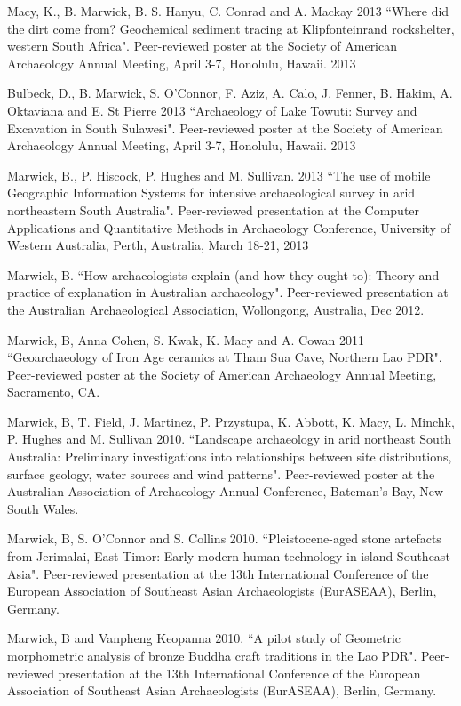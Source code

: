 \documentclass[11pt,article,oneside]{memoir}
\begin{document}
\ind Macy, K., B. Marwick, B. S. Hanyu, C. Conrad and A. Mackay 2013 ``Where did the dirt come from? Geochemical sediment tracing at Klipfonteinrand rockshelter, western South Africa". Peer-reviewed poster at the Society of American Archaeology Annual Meeting, April 3-7, Honolulu, Hawaii. 2013

\ind Bulbeck, D., B. Marwick, S. O'Connor, F. Aziz, A. Calo, J. Fenner, B. Hakim, A. Oktaviana and E. St Pierre 2013 ``Archaeology of Lake Towuti: Survey and Excavation in South Sulawesi". Peer-reviewed poster at the Society of American Archaeology Annual Meeting, April 3-7, Honolulu, Hawaii. 2013

\ind Marwick, B., P. Hiscock, P. Hughes and M. Sullivan. 2013 ``The use of mobile Geographic Information Systems for intensive archaeological survey in arid northeastern South Australia". Peer-reviewed presentation at the Computer Applications and Quantitative Methods in Archaeology Conference, University of Western Australia, Perth, Australia, March 18-21, 2013

\ind Marwick, B. ``How archaeologists explain (and how they ought to): Theory and practice of explanation in Australian archaeology". Peer-reviewed presentation at the Australian Archaeological Association, Wollongong, Australia, Dec 2012.

\ind Marwick, B, Anna Cohen, S. Kwak, K. Macy and A. Cowan 2011 ``Geoarchaeology of Iron Age ceramics at Tham Sua Cave, Northern Lao PDR". Peer-reviewed poster at the Society of American Archaeology Annual Meeting, Sacramento, CA.

\ind Marwick, B, T. Field, J. Martinez, P. Przystupa, K. Abbott, K. Macy, L. Minchk, P. Hughes and M. Sullivan 2010. ``Landscape archaeology in arid northeast South Australia: Preliminary investigations into relationships between site distributions, surface geology, water sources and wind patterns". Peer-reviewed poster at the Australian Association of Archaeology Annual Conference, Bateman’s Bay, New South Wales.

\ind Marwick, B, S. O’Connor and S. Collins 2010. ``Pleistocene-aged stone artefacts from Jerimalai, East Timor: Early modern human technology in island Southeast Asia". Peer-reviewed presentation at the 13th International Conference of the European Association of Southeast Asian Archaeologists (EurASEAA), Berlin, Germany.

\ind Marwick, B and Vanpheng Keopanna 2010. ``A pilot study of Geometric morphometric analysis of bronze Buddha craft traditions in the Lao PDR". Peer-reviewed presentation  at the 13th International Conference of the European Association of Southeast Asian Archaeologists (EurASEAA), Berlin, Germany.
\end{document}
